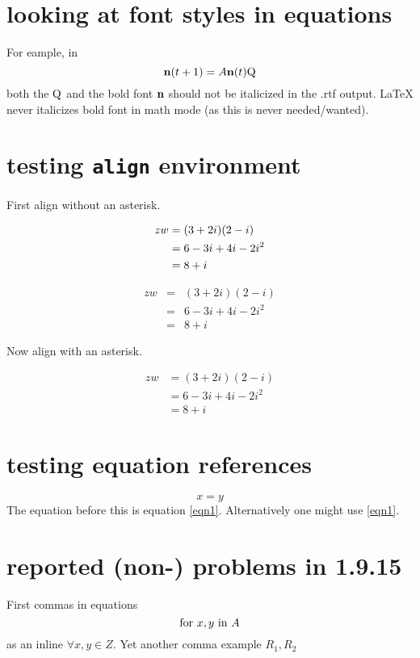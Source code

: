 \documentclass{article}
\begin{document}
\section{looking at font styles in equations}

For eample, in
\[ 
{\bf n}(t+1) = A {\bf n}(t) {\rm Q} 
\] 
both the $\rm Q$ and the bold font $\bf n$ should not be
italicized in the  .rtf output. LaTeX never italicizes bold font in math 
mode (as this is never needed/wanted). 

\section{testing \texttt{align} environment}

First align without an asterisk.

\begin{align} 
zw &=  (3+2i)(2-i) \notag \\ 
&=  6-3i+4i-2i^2   \notag \\ 
&=  8+i  \notag 
\end{align} 


\begin{eqnarray} 
zw &=&  (3+2i)(2-i) \nonumber \\ 
&=&  6-3i+4i-2i^2   \nonumber \\ 
&=&  8+i  \nonumber 
\end{eqnarray} 


Now align with an asterisk.


\begin{align*} 
zw &=  (3+2i)(2-i)  \\ 
&=  6-3i+4i-2i^2    \\ 
&=  8+i   
\end{align*} 


\section{testing equation references}
\begin{equation}
x=y
\label{eqn1}
\end{equation}
The equation before this is equation \ref{eqn1}.  Alternatively
one might use \eqref{eqn1}.

\section{reported (non-) problems in 1.9.15}
First commas in equations
$$
\hbox{for } x,y \hbox{ in } A
$$
as an inline $\forall x, y \in Z$.  Yet another comma example
$R_1, R_2$ 
\end{document}
